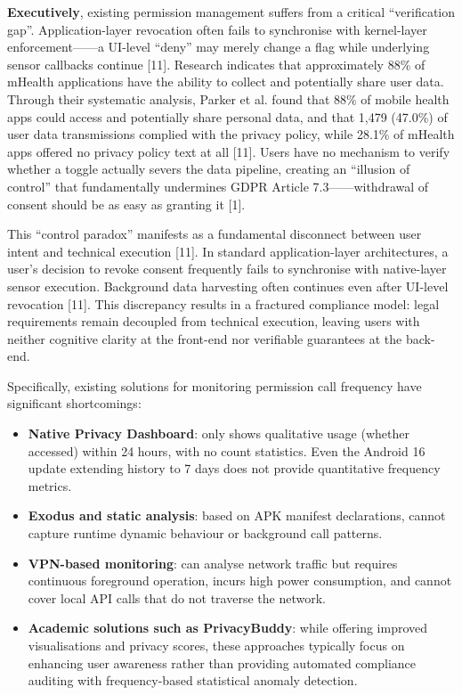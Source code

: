 \textbf{Executively}, existing permission management suffers from a critical ``verification gap''. Application-layer revocation often fails to synchronise with kernel-layer enforcement——a UI-level ``deny'' may merely change a flag while underlying sensor callbacks continue [11]. Research indicates that approximately 88\% of mHealth applications have the ability to collect and potentially share user data. Through their systematic analysis, Parker et al. found that 88\% of mobile health apps could access and potentially share personal data, and that 1,479 (47.0\%) of user data transmissions complied with the privacy policy, while 28.1\% of mHealth apps offered no privacy policy text at all [11]. Users have no mechanism to verify whether a toggle actually severs the data pipeline, creating an ``illusion of control'' that fundamentally undermines GDPR Article 7.3——withdrawal of consent should be as easy as granting it [1].

This ``control paradox'' manifests as a fundamental disconnect between user intent and technical execution [11]. In standard application-layer architectures, a user's decision to revoke consent frequently fails to synchronise with native-layer sensor execution. Background data harvesting often continues even after UI-level revocation [11]. This discrepancy results in a fractured compliance model: legal requirements remain decoupled from technical execution, leaving users with neither cognitive clarity at the front-end nor verifiable guarantees at the back-end.

Specifically, existing solutions for monitoring permission call frequency have significant shortcomings:

\begin{itemize}
\item \textbf{Native Privacy Dashboard}: only shows qualitative usage (whether accessed) within 24 hours, with no count statistics. Even the Android 16 update extending history to 7 days does not provide quantitative frequency metrics.
\item \textbf{Exodus and static analysis}: based on APK manifest declarations, cannot capture runtime dynamic behaviour or background call patterns.
\item \textbf{VPN-based monitoring}: can analyse network traffic but requires continuous foreground operation, incurs high power consumption, and cannot cover local API calls that do not traverse the network.
\item \textbf{Academic solutions such as PrivacyBuddy}: while offering improved visualisations and privacy scores, these approaches typically focus on enhancing user awareness rather than providing automated compliance auditing with frequency-based statistical anomaly detection.
\end{itemize}

